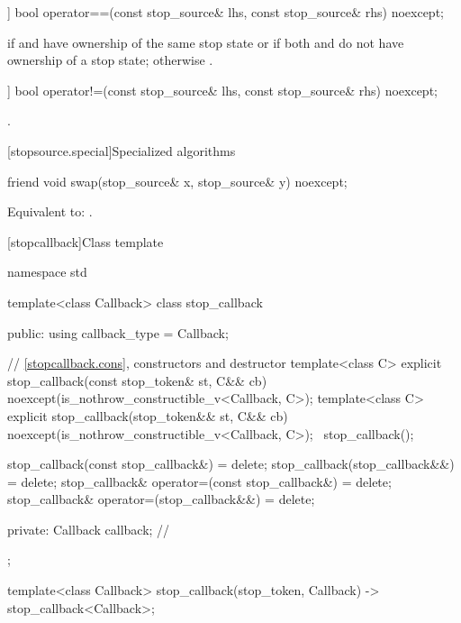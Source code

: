 %
\begin{itemdecl}
[[nodiscard]] bool operator==(const stop_source& lhs, const stop_source& rhs) noexcept;
\end{itemdecl}

\begin{itemdescr}
\pnum
\returns
{} if  and  have ownership
of the same stop state
or if both  and  do not have ownership of a stop state;
otherwise .
\end{itemdescr}

%
\begin{itemdecl}
[[nodiscard]] bool operator!=(const stop_source& lhs, const stop_source& rhs) noexcept;
\end{itemdecl}

\begin{itemdescr}
\pnum
\returns {}.
\end{itemdescr}

[stopsource.special]{Specialized algorithms}

%
\begin{itemdecl}
friend void swap(stop_source& x, stop_source& y) noexcept;
\end{itemdecl}

\begin{itemdescr}
\pnum
\effects Equivalent to: .
\end{itemdescr}

%
[stopcallback]{Class template }

\pnum
{}%
\begin{codeblock}
namespace std {
  template<class Callback>
  class stop_callback {
  public:
    using callback_type = Callback;

    // \ref{stopcallback.cons}, constructors and destructor
    template<class C>
    explicit stop_callback(const stop_token& st, C&& cb)
        noexcept(is_nothrow_constructible_v<Callback, C>);
    template<class C>
    explicit stop_callback(stop_token&& st, C&& cb)
        noexcept(is_nothrow_constructible_v<Callback, C>);
    ~stop_callback();

    stop_callback(const stop_callback&) = delete;
    stop_callback(stop_callback&&) = delete;
    stop_callback& operator=(const stop_callback&) = delete;
    stop_callback& operator=(stop_callback&&) = delete;

  private:
    Callback callback;      // \expos
  };

  template<class Callback>
  stop_callback(stop_token, Callback) -> stop_callback<Callback>;
}
\end{codeblock}

